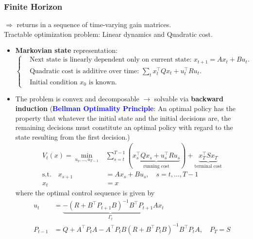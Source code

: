 \subsubsection*{Finite Horizon}
$\Rightarrow$ returns in a sequence of time-varying gain matrices.\\
Tractable optimization problem: Linear dynamics and Quadratic cost.
\begin{itemize}
    \item \textbf{Markovian state} representation:
        $\left\{
        \begin{aligned}
            &\text{Next state is linearly dependent only on current state: }x_{t+1} = A x_t + B u_t. \\
            &\text{Quadratic cost is additive over time: } \sum_t x_t^\top Q x_t + u_t^\top R u_t. \\
            &\text{Initial condition $x_0$ is known.}
        \end{aligned}
        \right.$
    \item The problem is convex and decomposable $\rightarrow$ solvable via \textbf{backward induction} (\textcolor{blue}{\textbf{Bellman Optimality Principle}}: An optimal policy has the property that whatever the initial state and the initial decisions are, the remaining decisions must constitute an optimal policy with regard to the state resulting from the first decision.)
    \begin{align*}
    V_t(x) = \min_{u_t, \ldots, u_{T-1}} &\sum_{s=t}^{T-1} ( \underbrace{x_s^\top Q x_s + u_s^\top R u_s}_{\text{running cost}} ) + \underbrace{x_T^\top S x_T}_{\text{terminal cost}} \\
    \text{s.t.} \quad x_{s+1} &= A x_s + B u_s, \quad s = t, \ldots, T-1 \\
    x_t &= x
    \end{align*}
    where the optimal control sequence is given by 
    \begin{align*}
        u_t &= \underbrace{-(R + B^\top P_{t+1} B)^{-1} B^\top P_{t+1} A}_{\Gamma_t} x_t \\
        P_{t-1} &= Q + A^\top P_t A - A^\top P_t B (R + B^\top P_t B)^{-1} B^\top P_t A, \quad P_T = S
    \end{align*}
\end{itemize}

